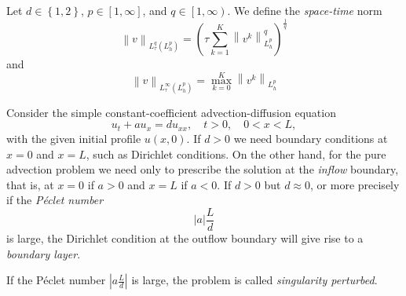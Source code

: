 \begin{frame}
    \begin{definition}
        Let $d\in\left\{1,2\right\}$, $p\in\left[1,\infty\right]$, and
        $q\in\left[1,\infty\right)$.
        We define the \emph{space-time} norm
        \begin{equation*}
            \left\|
            v
            \right\|_{L^{q}_{\tau}\left(L^{p}_{h}\right)}=
                {\left(\tau
                    \sum_{k=1}^{K}
                    \left\|v^{k}\right\|^{q}_{L^{p}_{h}}
                    \right)}^{\frac{1}{q}}
        \end{equation*}
        and
        \begin{equation*}
            \left\|
            v
            \right\|_{L^{\infty}_{\tau}\left(L^{p}_{h}\right)}=
            \max^{K}_{k=0}
            {\left\|
            v^{k}
            \right\|}_{L^{p}_{h}}
        \end{equation*}
    \end{definition}
\end{frame}

\begin{frame}
    \begin{definition}
        Consider the simple constant-coefficient advection-diffusion
        equation
        \begin{equation*}
            u_{t}+
            au_{x}=
            du_{xx},\quad
            t>0,\quad
            0<x<L,
        \end{equation*}
        with the given initial profile $u\left(x,0\right)$.
        If $d>0$ we need boundary conditions at $x=0$ and $x=L$,
        such as Dirichlet conditions.
        On the other hand, for the pure advection problem we need
        only to prescribe the solution at the \emph{inflow} boundary,
        that is, at $x=0$ if $a>0$ and $x=L$ if $a<0$.
        If $d>0$ but $d\approx0$, or more precisely if the
        \emph{Péclet number}
        \begin{equation*}
            \left|a\right|\frac{L}{d}
        \end{equation*}
        is large, the Dirichlet condition at the outflow boundary
        will give rise to a \emph{boundary layer}.

        If the Péclet number $\left|a\frac{L}{d}\right|$ is large,
        the problem is called \emph{singularity perturbed}.
    \end{definition}
\end{frame}